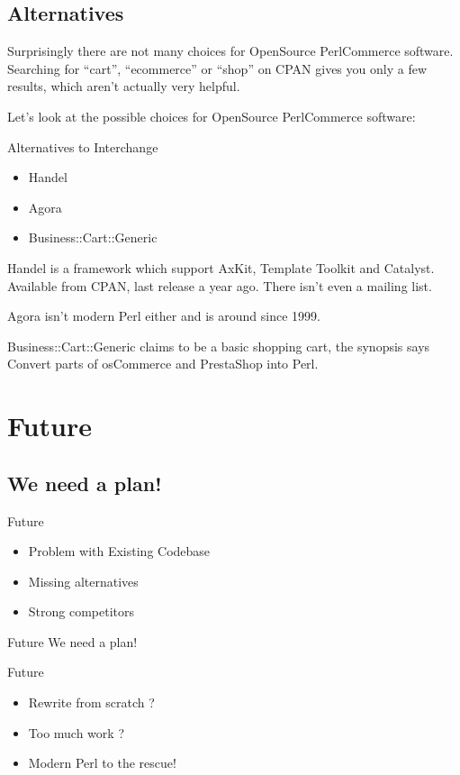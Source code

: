 \subsection{Alternatives}
Surprisingly there are not many choices for OpenSource PerlCommerce
software. Searching for ``cart'', ``ecommerce'' or ``shop'' on CPAN
gives you only a few results, which aren't actually very helpful.

Let's look at the possible choices for OpenSource PerlCommerce software:

\begin{frame}{Alternatives to Interchange}
\begin{itemize}
\item Handel
\item Agora
\item Business::Cart::Generic
\end{itemize}
\end{frame}

Handel is a framework which support AxKit, Template Toolkit 
and Catalyst.
Available from CPAN, last release a year ago.
There isn't even a mailing list.

Agora isn't modern Perl either and is around since 1999.

Business::Cart::Generic claims to be a basic shopping cart,
the synopsis says Convert parts of osCommerce and PrestaShop into
Perl.

\section{Future}
\subsection{We need a plan!}

\begin{frame}{Future}
\begin{itemize}
\item{Problem with Existing Codebase}
\item<2-3>{Missing alternatives}
\item<3>{Strong competitors}
\end{itemize}
\end{frame}

\begin{frame}{Future}
We need a plan!
\end{frame}

\begin{frame}{Future}
\begin{itemize}
\item Rewrite from scratch ?
\item<2-3> Too much work ?
\item<3> Modern Perl to the rescue!
\end{itemize}
\end{frame}

